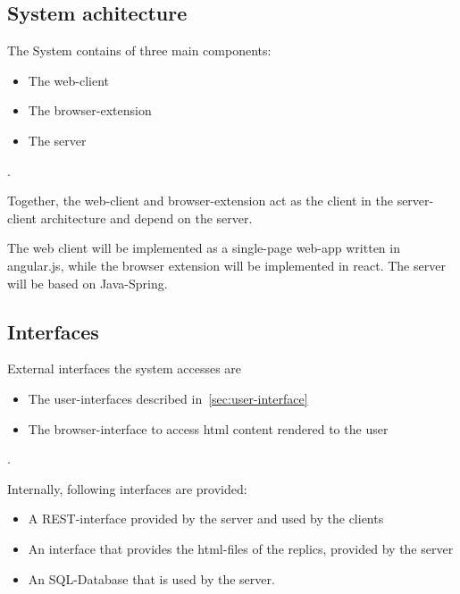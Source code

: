 \subsection{System achitecture}\label{subsec:system-achitecture}
The System contains of three main components:
\begin{itemize}
    \item The web-client
    \item The browser-extension
    \item The server
\end{itemize}.

Together, the web-client and browser-extension act as the client in the server-client architecture and depend on the server.

The web client will be implemented as a single-page web-app written in angular.js, while the browser extension will be implemented in react.
The server will be based on Java-Spring.

\subsection{Interfaces}\label{subsec:interfaces}
External interfaces the system accesses are
\begin{itemize}
    \item The user-interfaces described in~\ref{sec:user-interface}
    \item The browser-interface to access html content rendered to the user
\end{itemize}.

Internally, following interfaces are provided:
\begin{itemize}
    \item A REST-interface provided by the server and used by the clients
    \item An interface that provides the html-files of the replics, provided by the server
    \item An SQL-Database that is used by the server.
\end{itemize}